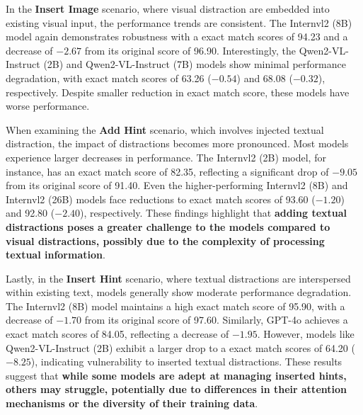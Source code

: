 In the \textbf{Insert Image} scenario, where visual distraction are embedded into existing visual input, the performance trends are consistent. The Internvl2 (8B) model again demonstrates robustness with a exact match scores of 94.23 and a decrease of $-2.67$ from its original score of 96.90. Interestingly, the Qwen2-VL-Instruct (2B) and Qwen2-VL-Instruct (7B) models show minimal performance degradation, with exact match scores of 63.26 ($-0.54$) and 68.08 ($-0.32$), respectively. Despite smaller reduction in exact match score, these models have worse performance. 

When examining the \textbf{Add Hint} scenario, which involves injected textual distraction, the impact of distractions becomes more pronounced. Most models experience larger decreases in performance. The Internvl2 (2B) model, for instance, has an exact match score of 82.35, reflecting a significant drop of $-9.05$ from its original score of 91.40. Even the higher-performing Internvl2 (8B) and Internvl2 (26B) models face reductions to exact match scores of 93.60 ($-1.20$) and 92.80 ($-2.40$), respectively. These findings highlight that \textbf{adding textual distractions poses a greater challenge to the models compared to visual distractions, possibly due to the complexity of processing  textual information}. 

Lastly, in the \textbf{Insert Hint} scenario, where textual distractions are interspersed within existing text, models generally show moderate performance degradation. The Internvl2 (8B) model maintains a high exact match score of 95.90, with a decrease of $-1.70$ from its original score of 97.60. Similarly, GPT-4o achieves a exact match scores of 84.05, reflecting a decrease of $-1.95$. However, models like Qwen2-VL-Instruct (2B) exhibit a larger drop to a exact match scores of 64.20 ($-8.25$), indicating vulnerability to inserted textual distractions. These results suggest that \textbf{while some models are adept at managing inserted hints, others may struggle, potentially due to differences in their attention mechanisms or the diversity of their training data}.